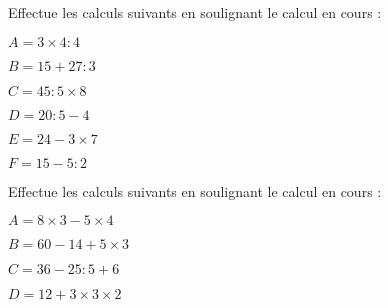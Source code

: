 \begin{exercice}
Effectue les calculs suivants en soulignant le calcul en cours :
 \begin{colitemize}{2}
\item $A = 3 \times 4 : 4$

\dotfill

\dotfill

\item $B = 15 + 27 : 3$

\dotfill
	
\dotfill

\item $C = 45 : 5 \times 8$

\dotfill
	
\dotfill

\item $D = 20 : 5 - 4$

\dotfill
	
\dotfill

\item $E = 24 - 3 \times 7$

\dotfill
	
\dotfill

\item $F = 15 - 5 : 2$

\dotfill

\dotfill

\end{colitemize}
\end{exercice}


\begin{exercice}
Effectue les calculs suivants en soulignant le calcul en cours :
 \begin{colitemize}{2}
\item $A = 8 \times 3 - 5 \times 4$

\dotfill

\dotfill

\item $B = 60 - 14 + 5 \times 3$

\dotfill

\dotfill

\item $C = 36 - 25 : 5 + 6$

\dotfill

\dotfill

\item $D = 12 + 3 \times 3 \times 2$

\dotfill

\dotfill
 \end{colitemize}
\end{exercice}


